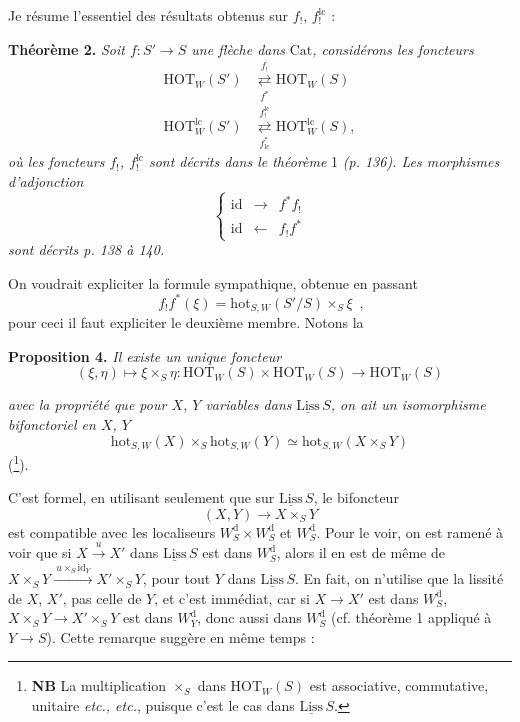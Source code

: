 \documentclass[11pt]{article}
\newcommand{\printedpage}[1]{\marginpar{\footnotesize p.~#1}}
\newcommand{\msp}[1]{\marginpar{\footnotesize [#1]}}
\newcommand{\Cat}{\mathrm{Cat}}
\newcommand{\HOT}{\mathrm{HOT}}
\newcommand{\hot}{\mathrm{hot}}
\newcommand{\id}{\mathrm{id}}
\newcommand{\Liss}{\underline{\mathrm{Liss}}\,}
\newcommand{\dd}{\mathrm{d}}
\newcommand{\lc}{\mathrm{lc}}
\newcommand{\adj}[2]{\mathrel{\underset{#2}{\overset{#1}{\rightleftarrows}}}}
\begin{document}
Je résume l'essentiel des résultats obtenus sur $f_!$, $f_!^{\lc}$ :

\textbf{Théorème 2.} \textit{Soit $f : S' \longrightarrow S$ une flèche dans} $\Cat$\textit{, considérons les foncteurs}
\[
\begin{aligned}
\HOT_W(S') &\adj{f_!}{f^*} \HOT_W(S) \\
\HOT^{\lc}_W(S') &\adj{f_!^{\lc}}{f^*_{\lc}} \HOT^{\lc}_W(S),
\end{aligned}
\]
\msp{page 151}
\textit{où les foncteurs $f_!$, $f_!^{\lc}$ sont décrits dans le théorème} 1 \textit{(p. 136). Les morphismes d'adjonction}
\[
\left\{
\begin{array}{lcl}
\id & \longrightarrow & f^*f_! \\[1ex]
\id & \longleftarrow & f_!f^*
\end{array}
\right.
\]
\textit{sont décrits p. 138 à 140.}

On voudrait expliciter la formule sympathique, obtenue en passant
\[
\boxed{\;f_!f^*(\xi) = \hot_{S,W}(S'/S) \times_S \xi\;}\ ,
\]
pour ceci il faut expliciter le deuxième membre. Notons la

\textbf{Proposition 4.} \textit{Il existe un unique foncteur}
\[
(\xi, \eta) \longmapsto \xi \times_S \eta : \HOT_W(S) \times \HOT_W(S) \longrightarrow \HOT_W(S)
\]


\printedpage{93}

\textit{avec la propriété que pour $X$, $Y$ variables dans} $\Liss S$\textit{, on ait un isomorphisme bifonctoriel en $X$, $Y$}
\[
\hot_{S,W}(X) \times_S \hot_{S,W}(Y) \simeq \hot_{S,W}(X \times_S Y)
\tag*{$(*)$}
\]
(\footnote[72]{\textbf{NB} La multiplication $\times_S$ dans $\HOT_W(S)$ est associative, commutative, unitaire \textit{etc., etc.}, puisque c'est le cas dans $\Liss S$.}).

C'est formel, en utilisant seulement que sur $\Liss S$, le bifoncteur
\[
(X, Y) \longrightarrow X \times_S Y
\]
est compatible avec les localiseurs $W^{\dd}_S \times W^{\dd}_S$ et $W^{\dd}_S$. Pour le voir, on est ramené à voir que si $X \xrightarrow{u} X'$ dans $\Liss S$ est dans $W^{\dd}_S$, alors il en est de même de $X \times_S Y \xrightarrow{\ u\times_S \id_Y\ } X' \times_S Y$, pour tout
\msp{page 152}
$Y$ dans $\Liss S$. En fait, on n'utilise que la lissité de $X$, $X'$, pas celle de $Y$, et c'est immédiat, car si $X \longrightarrow X'$ est dans $W^{\dd}_S$, $X \times_S Y \longrightarrow X' \times_S Y$ est dans $W^{\dd}_Y$, donc aussi dans $W^{\dd}_S$ (cf. théorème 1 appliqué à $Y \longrightarrow S$). Cette remarque suggère en même temps :
\end{document}

